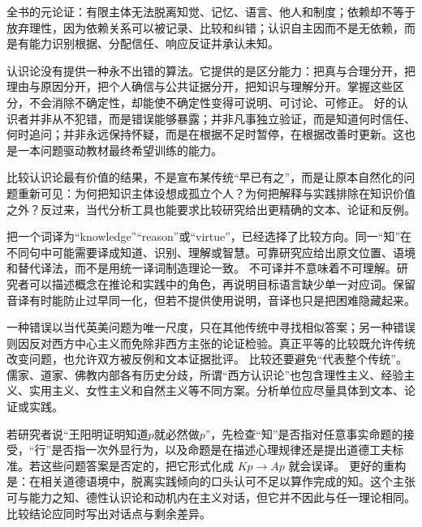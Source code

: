 \begin{argumentbox}
全书的元论证：有限主体无法脱离知觉、记忆、语言、他人和制度；依赖却不等于放弃理性，因为依赖关系可以被记录、比较和纠错；认识自主因而不是无依赖，而是有能力识别根据、分配信任、响应反证并承认未知。
\end{argumentbox}

认识论没有提供一种永不出错的算法。它提供的是区分能力：把真与合理分开，把理由与原因分开，把个人确信与公共证据分开，把知识与理解分开。掌握这些区分，不会消除不确定性，却能使不确定性变得可说明、可讨论、可修正。 好的认识者并非从不犯错，而是错误能够暴露；并非凡事独立验证，而是知道何时信任、何时追问；并非永远保持怀疑，而是在根据不足时暂停，在根据改善时更新。这也是一本问题驱动教材最终希望训练的能力。

\begin{comparison}
比较认识论最有价值的结果，不是宣布某传统“早已有之”，而是让原本自然化的问题重新可见：为何把知识主体设想成孤立个人？为何把解释与实践排除在知识价值之外？反过来，当代分析工具也能要求比较研究给出更精确的文本、论证和反例。
\end{comparison}

把一个词译为“knowledge”“reason”或“virtue”，已经选择了比较方向。同一“知”在不同句中可能需要译成知道、识别、理解或智慧。可靠研究应给出原文位置、语境和替代译法，而不是用统一译词制造理论一致。 不可译并不意味着不可理解。研究者可以描述概念在推论和实践中的角色，再说明目标语言缺少单一对应词。保留音译有时能防止过早同一化，但若不提供使用说明，音译也只是把困难隐藏起来。

一种错误以当代英美问题为唯一尺度，只在其他传统中寻找相似答案；另一种错误则因反对西方中心主义而免除非西方主张的论证检验。真正平等的比较既允许传统改变问题，也允许双方被反例和文本证据批评。 比较还要避免“代表整个传统”。儒家、道家、佛教内部各有历史分歧，所谓“西方认识论”也包含理性主义、经验主义、实用主义、女性主义和自然主义等不同方案。分析单位应尽量具体到文本、论证或实践。

若研究者说“王阳明证明知道$p$就必然做$p$”，先检查“知”是否指对任意事实命题的接受，“行”是否指一次外显行为，以及命题是在描述心理规律还是提出道德工夫标准\parencite{tiwald2014}。若这些问题答案是否定的，把它形式化成 $Kp\rightarrow Ap$ 就会误译。 更好的重构是：在相关道德语境中，脱离实践倾向的口头认可不足以算作完成的知。这个主张可与能力之知、德性认识论和动机内在主义对话，但它并不因此与任一理论相同。比较结论应同时写出对话点与剩余差异。
